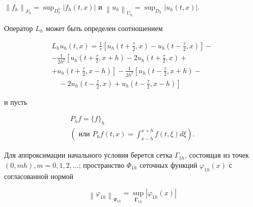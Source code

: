 \documentclass[10pt]{article}
\begin{document}
$\left\|f_{h}\right\|_{F_{h}}=\sup _{D_{h}^{0}}\left|f_{h}(t, x)\right|$ и $\left\|u_{h}\right\|_{U_{h}}=\sup _{D_{h}}\left|u_{h}(t, x)\right|$.



Оператор $L_{h}$ может быть определен соотношением



\[

\begin{gathered}

L_{h} u_{h}(t, x)=\frac{1}{\tau}\left[u_{h}\left(t+\frac{\tau}{2}, x\right)-u_{h}\left(t-\frac{\tau}{2}, x\right)\right]- \\

-\frac{1}{2 h^{2}}\left[u_{h}\left(t+\frac{\tau}{2}, x+h\right)-2 u_{h}\left(t+\frac{\tau}{2}, x\right)+\right. \\

\left.+u_{h}\left(t+\frac{\tau}{2}, x-h\right)\right]-\frac{1}{2 h^{2}}\left[u_{h}\left(t-\frac{\tau}{2}, x+h\right)-\right. \\

\left.\quad-2 u_{h}\left(t-\frac{\tau}{2}, x\right)+u_{h}\left(t-\frac{\tau}{2}, x-h\right)\right]

\end{gathered}

\]



и пусть



\[

\begin{gathered}

P_{h} f=\{f\}_{h} \\

\left(\text { или } P_{h} f(t, x)=\int_{x-h}^{x+h} f(t, \xi) d \xi\right) .

\end{gathered}

\]



Для аппроксимации начального условия берется сетка $\Gamma_{1 h}$, состоящая из точек $(0, m h), m=0,1,2, \ldots$; пространство $\Phi_{1 h}$ сеточных функций $\varphi_{1 h}(x)$ с согласованной нормой



\[

\left\|\varphi_{1 h}\right\|_{\Phi_{1 h}}=\sup _{\boldsymbol{\Gamma}_{1 h}}\left|\varphi_{1 h}(x)\right|

\]
\end{document}
